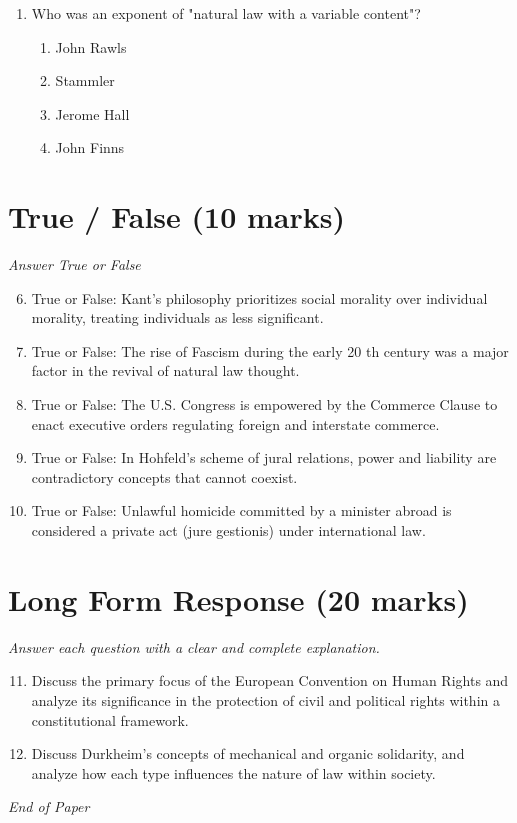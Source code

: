 \documentclass[12pt]{article}
\begin{document}
\begin{enumerate}[label=\arabic*.]
\begin{enumerate}[label=(\alph*)]
    \item Conflict.
    \item Love.
    \item War.
    \item Reciprocity.
\end{enumerate}
\item Who was an exponent of "natural law with a variable content"?
\begin{enumerate}[label=(\alph*)]
    \item John Rawls
    \item Stammler
    \item Jerome Hall
    \item John Finns
\end{enumerate}
\end{enumerate}

\section*{True / False (10 marks)}
\textit{Answer True or False}
\begin{enumerate}[label=\arabic*.]
\setcounter{enumi}{5}
\item True or False: Kant's philosophy prioritizes social morality over individual morality, treating individuals as less significant.
\item True or False: The rise of Fascism during the early 20 th century was a major factor in the revival of natural law thought.
\item True or False: The U.S. Congress is empowered by the Commerce Clause to enact executive orders regulating foreign and interstate commerce.
\item True or False: In Hohfeld's scheme of jural relations, power and liability are contradictory concepts that cannot coexist.
\item True or False: Unlawful homicide committed by a minister abroad is considered a private act (jure gestionis) under international law.
\end{enumerate}

\section*{Long Form Response (20 marks)}
\textit{Answer each question with a clear and complete explanation.}
\begin{enumerate}[label=\arabic*.]
\setcounter{enumi}{10}
\item Discuss the primary focus of the European Convention on Human Rights and analyze its significance in the protection of civil and political rights within a constitutional framework.
\item Discuss Durkheim's concepts of mechanical and organic solidarity, and analyze how each type influences the nature of law within society.
\end{enumerate}

\vfill
\noindent\textit{End of Paper}
\end{document}

